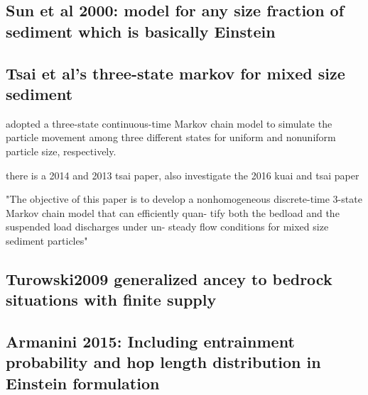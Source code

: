 \subsection*{Sun et al 2000: model for any size fraction of sediment which is basically Einstein}
\citep{Sun2000}

\subsection*{Tsai et al's three-state markov for mixed size sediment} 
\citep{Tsai2013, Tsai2014, Kuai2016}

adopted a three-state
continuous-time Markov chain model to simulate the particle
movement among three different states for uniform and nonuniform
particle size, respectively.

there is a 2014 and 2013 tsai paper, also investigate the 2016 kuai and tsai paper 

"The objective of this paper is to develop a nonhomogeneous
discrete-time 3-state Markov chain model that can efficiently quan-
tify both the bedload and the suspended load discharges under un-
steady flow conditions for mixed size sediment particles"

\subsection*{Turowski2009 generalized ancey to bedrock situations with finite supply} 
\citep{Turowski2009}



\subsection*{Armanini 2015: Including entrainment probability and hop length distribution in Einstein formulation} 
\citep{Armanini2015}



